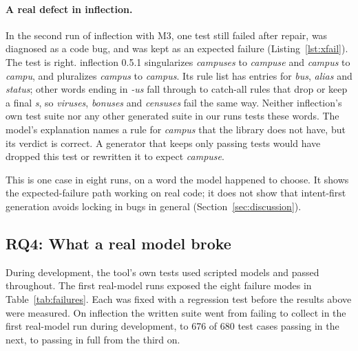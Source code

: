 \documentclass[11pt]{article}
\begin{document}
\paragraph{A real defect in inflection.}
In the second run of inflection with M3, one test still failed after repair, was diagnosed as a code bug, and was kept as an expected failure (Listing~\ref{lst:xfail}).
The test is right.
inflection 0.5.1 singularizes \emph{campuses} to \emph{campuse} and \emph{campus} to \emph{campu}, and pluralizes \emph{campus} to \emph{campus}.
Its rule list has entries for \emph{bus}, \emph{alias} and \emph{status}; other words ending in \emph{-us} fall through to catch-all rules that drop or keep a final \emph{s}, so \emph{viruses}, \emph{bonuses} and \emph{censuses} fail the same way.
Neither inflection's own test suite nor any other generated suite in our runs tests these words.
The model's explanation names a rule for \emph{campus} that the library does not have, but its verdict is correct.
A generator that keeps only passing tests would have dropped this test or rewritten it to expect \emph{campuse}.

This is one case in eight runs, on a word the model happened to choose.
It shows the expected-failure path working on real code; it does not show that intent-first generation avoids locking in bugs in general (Section~\ref{sec:discussion}).

\subsection{RQ4: What a real model broke}\label{sec:failures}
During development, the tool's own tests used scripted models and passed throughout.
The first real-model runs exposed the eight failure modes in Table~\ref{tab:failures}.
Each was fixed with a regression test before the results above were measured.
On inflection the written suite went from failing to collect in the first real-model run during development, to 676 of 680 test cases passing in the next, to passing in full from the third on.
\end{document}

